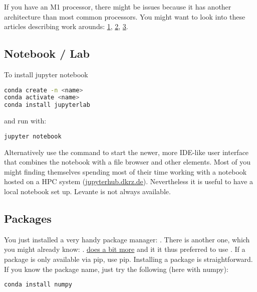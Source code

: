 \documentclass{article}
\begin{document}
\noindent If you have an M1 processor, there might be issues because it has another architecture than most common processors. You might want to look into these articles describing work arounds: \href{https://www.stuartellis.name/articles/mac-setup/}{1}, \href{https://dev.to/courier/tips-and-tricks-to-setup-your-apple-m1-for-development-547g}{2}, \href{https://codeburst.io/my-ultimate-m1-mac-developer-setup-cfdb2daeed2d}{3}.




\subsection*{ Notebook / Lab} 

To install jupyter notebook 
\begin{lstlisting}[language=bash]
conda create -n <name>
conda activate <name>
conda install jupyterlab
\end{lstlisting}
and run with:
\begin{lstlisting}[language=bash]
jupyter notebook
\end{lstlisting}

Alternatively use the command  to start the newer, more IDE-like user interface that combines the notebook with a file browser and other elements.
Most of you might finding themselves spending most of their time working with a notebook hosted on a HPC system (\href{http://jupyterhub.dkrz.de/}{jupyterhub.dkrz.de}). Nevertheless it is useful to have a local notebook set up. Levante is not always available.


\clearpage

\subsection*{ Packages}

You just installed a very handy package manager: . There is another one, which you might already know: .  \href{https://stackoverflow.com/questions/20994716/what-is-the-difference-between-pip-and-conda}{does a bit more} and it it thus preferred to use . If a package is only available via pip, use pip. 
Installing a package is straightforward. If you know the package name, just try the following (here with numpy):
\begin{lstlisting}[language=bash]
conda install numpy
\end{lstlisting}
\end{document}
